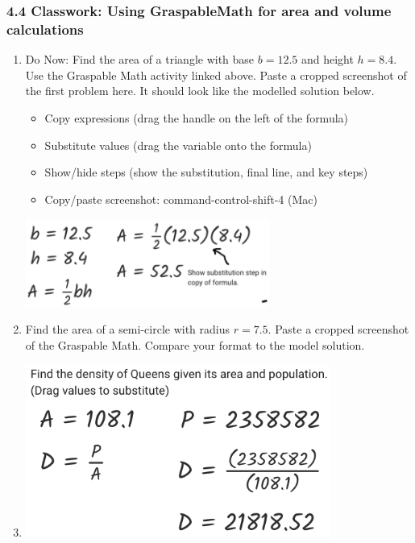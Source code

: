 

\fancyhead[LE]{\thepage}



\subsubsection*{4.4 Classwork: Using GraspableMath for area and volume calculations}
\begin{enumerate}
\item Do Now: Find the area of a triangle with base $b=12.5$ and height $h=8.4$. Use the Graspable Math activity linked above. Paste a cropped screenshot of the first problem here. It should look like the modelled solution below.
\begin{itemize}[label=$\square$]
  \item Copy expressions (drag the handle on the left of the formula)
  \item Substitute values (drag the variable onto the formula)
  \item Show/hide steps (show the substitution, final line, and key steps)
  \item Copy/paste screenshot: command-control-shift-4 (Mac)
\end{itemize}
\begin{flushright}
  \includegraphics[width=8cm]{../graphics/04model-solution.png}
\end{flushright}

\item Find the area of a semi-circle with radius $r=7.5$. Paste a cropped screenshot of the Graspable Math. Compare your format to the model solution.
\item \vspace{4cm}
\begin{flushright}
  \includegraphics[width=10cm]{../graphics/04solution.png}
\end{flushright}


\end{enumerate}
